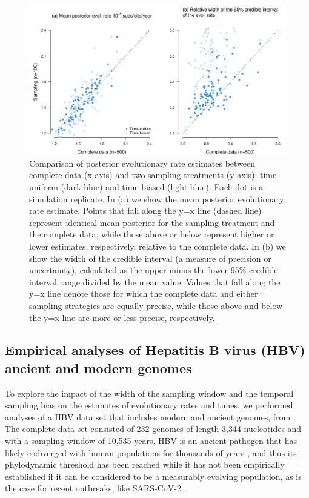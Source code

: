 \documentclass[11pt]{article}
\begin{document}
\begin{figure}[H]
	\begin{center}
		\includegraphics[scale=0.5, angle=0]{sampling_bias_summary_rates.pdf}
		\caption{Comparison of posterior evolutionary rate estimates between complete data (x-axis) and two sampling treatments (y-axis): time-uniform (dark blue) and time-biased (light blue). Each dot is a simulation replicate. In (a) we show the mean posterior evolutionary rate estimate. Points that fall along the y=x line (dashed line) represent identical mean posterior for the sampling treatment and the complete data, while those above or below represent higher or lower estimates, respectively, relative to the complete data. In (b) we show the width of the credible interval (a measure of precision or uncertainty), calculated as the upper minus the lower 95\% credible interval range divided by the mean value. Values that fall along the y=x line denote those for which the complete data and either sampling strategies are equally precise, while those above and below the y=x line are more or less precise, respectively.}
		\label{figure:Fig5}
	\end{center}
\end{figure}

\subsection{Empirical analyses of Hepatitis B virus (HBV) ancient and modern genomes}
To explore the impact of the width of the sampling window and the temporal sampling bias on the estimates of evolutionary rates and times, we performed analyses of a HBV data set that includes modern and ancient genomes, from \cite{kocher2021ten}. The complete data set consisted of 232 genomes of length 3,344 nucleotides and with a sampling window of 10,535 years. HBV is an ancient pathogen that has likely codiverged with human populations for thousands of years \citep{locarnini2021origins, zehender2014enigmatic, paraskevis2013dating, muhlemann2018ancient}, and thus its phylodynamic threshold has been reached while it has not been empirically established if it can be considered to be a measurably evolving population, as is the case for recent outbreaks, like SARS-CoV-2 \citep{duchene2020temporal}. 
\end{document}
